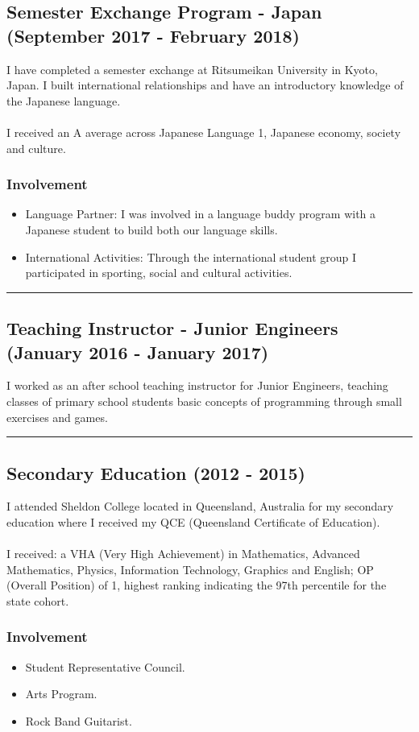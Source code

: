 \subsection*{Semester Exchange Program - Japan (September 2017 - February 2018)}
I have completed a semester exchange at Ritsumeikan University in Kyoto, Japan. I built international relationships and have an introductory knowledge of the Japanese language.\\
\\
I received an A average across Japanese Language 1, Japanese economy, society and culture.

\subsubsection*{Involvement}
\begin{itemize}
  \setlength\itemsep{0.1em}
  \item Language Partner: I was involved in a language buddy program with a Japanese student to build both our language skills.
  \item International Activities: Through the international student group I participated in sporting, social and cultural activities.
\end{itemize}

\noindent\rule{\textwidth}{0.5pt}

\subsection*{Teaching Instructor - Junior Engineers (January 2016 - January 2017)}

I worked as an after school teaching instructor for Junior Engineers, teaching classes of primary school students basic concepts of programming through small exercises and games.

\noindent\rule{\textwidth}{0.5pt}

\subsection*{Secondary Education (2012 - 2015)}

I attended Sheldon College located in Queensland, Australia for my secondary education where I received my QCE (Queensland Certificate of Education).\\
\\
I received: a VHA (Very High Achievement) in Mathematics, Advanced Mathematics, Physics, Information Technology, Graphics and English; OP (Overall Position) of 1, highest ranking indicating the 97th percentile for the state cohort.

\subsubsection*{Involvement}

\begin{itemize}
  \setlength\itemsep{0.1em}
  \item Student Representative Council.
  \item Arts Program.
  \item Rock Band Guitarist.
\end{itemize}


